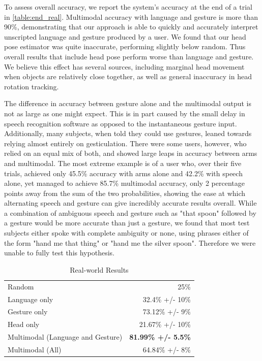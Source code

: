 \documentclass[a4paper, 11pt]{article} %
\begin{document}
To assess overall accuracy, we report the system's accuracy at the end
of a trial in \ref{table:end_real}.  Multimodal accuracy with language
and gesture is more than 90\%, demonstrating that our approach is able
to quickly and accurately interpret unscripted language and gesture
produced by a user.  We found that our head pose estimator was quite
inaccurate, performing slightly below random.  Thus overall
results that include head pose perform worse than language and
gesture.  We believe this effect has several sources, including marginal head movement when objects are relatively close together, as well as general inaccuracy in head rotation tracking. 

The difference in accuracy between gesture alone and the multimodal output is not as large as one might expect. This is in part caused by the small delay in speech recognition software as opposed to the instantaneous gesture input. Additionally, many subjects, when told they could use gestures, leaned towards relying almost entirely on gesticulation. There were some users, however, who relied on an equal mix of both, and showed large leaps in accuracy between arms and multimodal. The most extreme example is of a user who, over their five trials, achieved only 45.5\% accuracy with arms alone and 42.2\% with speech alone, yet managed to achieve 85.7\% multimodal accuracy, only 2 percentage points away from the sum of the two probabilities, showing the ease at which alternating speech and gesture can give incredibly accurate results overall. While a combination of ambiguous speech and gesture such as "that spoon" followed by a gesture would be more accurate than just a gesture, we found that most test subjects either spoke with complete ambiguity or none, using phrases either of the form "hand me that thing" or "hand me the silver spoon". Therefore we were unable to fully test this hypothesis.
\begin{table}
\caption{Real-world Results\label{table:real_results}}
\centering
\begin{tabular}{lr}
\toprule
Random & 25\%\\
Language only &  32.4\% +/- 10\%\\
Gesture only  &  73.12\% +/- 9\%\\
Head only     &  21.67\% +/- 10\%\\
Multimodal (Language and Gesture) & {\bf 81.99\% +/- 5.5\%}\\
Multimodal (All) &  64.84\% +/- 8\%\\
\bottomrule
\end{tabular}
\end{table}
\end{document}
